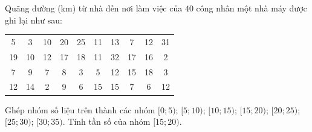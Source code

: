 \begin{ex}%
	 Quãng đường (km) từ nhà đến nơi làm việc của $40$ công nhân một nhà máy được ghi lại như sau:
	\begin{center}
		\begin{tabular}{cccccccccc}
			5 & 3 & 10 & 20  & 25 & 11 & 13 & 7 & 12 & 31 \\
			19 & 10 & 12 & 17 & 18 & 11 & 32 & 17  & 16 & 2\\
			7 & 9 &  7 & 8 & 3 & 5 & 12 & 15 & 18 & 3 \\
			12 & 14 & 2 &  9 & 6 & 15 & 15 & 7 & 6 & 12
		\end{tabular}
	\end{center}
	Ghép nhóm  số liệu trên thành các nhóm
	$[0;5)$; $[5;10)$; $[10;15)$; $[15;20)$; $[20;25)$; $[25;30)$; $[30;35)$. Tính tần số của nhóm  $[15;20)$.
	\loigiai{ 
	Tần  số của nhóm $[15;20)$ là: $ n=9$.}
\end{ex}

